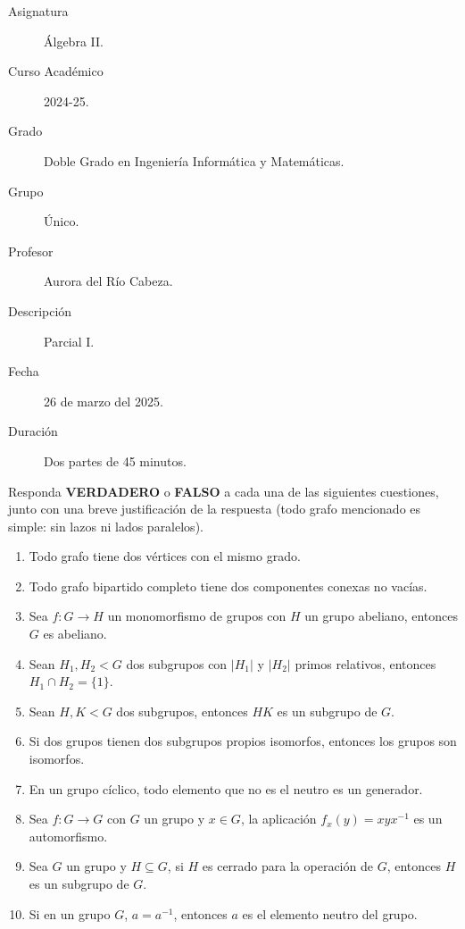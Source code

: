 \documentclass[12pt]{article}
\begin{document}

    
    

    \begin{description}
        \item[Asignatura] Álgebra II.
        \item[Curso Académico] 2024-25.
        \item[Grado] Doble Grado en Ingeniería Informática y Matemáticas.
        \item[Grupo] Único.
        \item[Profesor] Aurora del Río Cabeza.
        \item[Descripción] Parcial I.
        \item[Fecha] 26 de marzo del 2025.
        \item[Duración] Dos partes de 45 minutos.
    
    \end{description}
    \newpage

    \begin{ejercicio}[5 puntos]
        Responda \textbf{VERDADERO} o \textbf{FALSO} a cada una de las siguientes cuestiones, junto con una breve justificación de la respuesta (todo grafo mencionado es simple: sin lazos ni lados paralelos).
        \begin{enumerate}
            \item Todo grafo tiene dos vértices con el mismo grado.
            \item Todo grafo bipartido completo tiene dos componentes conexas no vacías.
            \item Sea $f:G\to H$ un monomorfismo de grupos con $H$ un grupo abeliano, entonces $G$ es abeliano.
            \item Sean $H_1,H_2<G$ dos subgrupos con $|H_1|$ y $|H_2|$ primos relativos, entonces $H_1\cap H_2 = \{1\}$.
            \item Sean $H,K<G$ dos subgrupos, entonces $HK$ es un subgrupo de $G$.
            \item Si dos grupos tienen dos subgrupos propios isomorfos, entonces los grupos son isomorfos.
            \item En un grupo cíclico, todo elemento que no es el neutro es un generador.
            \item Sea $f:G\to G$ con $G$ un grupo y $x\in G$, la aplicación $f_x(y) = xyx^{-1}$ es un automorfismo.
            \item Sea $G$ un grupo y $H\subseteq G$, si $H$ es cerrado para la operación de $G$, entonces $H$ es un subgrupo de $G$.
            \item Si en un grupo $G$, $a=a^{-1}$, entonces $a$ es el elemento neutro del grupo.
        \end{enumerate}
    \end{ejercicio}
\end{document}
